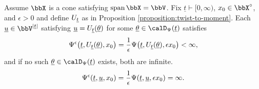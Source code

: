 \begin{proposition}
  \label{proposition:aff-fdd-asymptotics}
  Assume $\stateSpace$ is a cone satisfying $\operatorname{span}\stateSpace = \vecSpace$.
  Fix $\underline t \vdash [0,\infty)$, $\stateVar_0 \in \stateSpace^\circ$, and $\epsilon > 0$ and define $U_{\underline t}$ as in Proposition \ref{proposition:twist-to-moment}.
  Each $\underline\momentVar \in \vecSpace^{|\underline t|}$ satisfying $\underline{u} = U_{\underline t}(\underline{\theta})$ for some $\underline\twistVar \in \momentSpace(\underline t)$ satisfies
  \begin{equation*}
    \Psi^\epsilon\big(\underline t, U_{\underline t}(\underline{\theta}), x_0\big) = \frac1\epsilon \Psi\big(\underline t, U_{\underline t}(\underline{\theta}), \epsilon x_0\big) < \infty,
  \end{equation*}
  and if no such $\underline\twistVar \in \momentSpace(\underline t)$ exists, both are infinite.
  \begin{equation*}
    \Psi^\epsilon(\underline t, \underline{u}, x_0) = \frac1\epsilon \Psi(\underline t, \underline{u}, \epsilon x_0) = \infty.
  \end{equation*}
\end{proposition}
